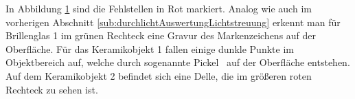 {
	\begin{figure}[H]
		\centering
		
		\label{tikz:abbNachbearbeitungSpLichtstreuung}
	\end{figure}
}

\noindent
In Abbildung \ref{tikz:abbNachbearbeitungSpLichtstreuung} sind die Fehlstellen in Rot markiert. 
Analog wie auch im vorherigen Abschnitt \ref{sub:durchlichtAuswertungLichtstreuung} erkennt man für Brillenglas 1 im grünen Rechteck eine Gravur des Markenzeichens auf der Oberfläche.
Für das Keramikobjekt 1 fallen einige dunkle Punkte im Objektbereich auf, welche durch sogenannte \glqq Pickel \grqq ~auf der Oberfläche entstehen.
Auf dem Keramikobjekt 2 befindet sich eine Delle, die im größeren roten Rechteck zu sehen ist.


